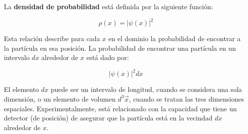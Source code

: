 La \textbf{densidad de probabilidad} está definida por la siguiente función:

\begin{equation}
 \label{eq:density probablity}
\rho(x)=|\psi(x)|^2
\end{equation}

Esta relación describe para cada $x$ en el dominio la probabilidad de encontrar a la partícula en esa posición. La probabilidad de encontrar una partícula en un intervalo $dx$ alrededor de $x$ está dado por:

 $$|\psi(x)|^2 dx $$

 El elemento $dx$ puede ser un intervalo de longitud, cuando se considera una sola dimensión, o un elemento de volumen $d^3\vec{x}$, cuando se tratan las tres dimensiones espaciales. Experimentalmente, está relacionado con la capacidad que tiene un detector (de posición) de asegurar que la partícula está en la vecindad $dx$ alrededor de $x$.



 
\begin{comment}
\subsection{Ecuación de Schrödinger dependiente del tiempo}

La \autoref{eq:TDSE ket} se puede escribir en términos de la función de onda. Dado que en esta sección y en las posteriores se estará tratando la evolución temporal de un sistema, se hará referencia a la variable del tiempo $t$ en la función de onda: $\psi(\vec{x},t)$. 
\\
Tomando el operador Hamiltoniano en el espacio de posiciones:
\begin{equation}
  \label{eq:Hamiltoniano}
  H = \frac{\vec{p}^2}{2m}+V(\vec{x})
\end{equation}
\end{comment}


